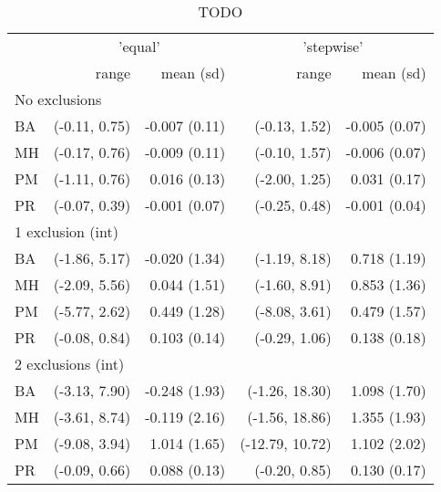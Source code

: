 \begin{table}[t]
\caption{TODO} 
\fontsize{12.0pt}{14.4pt}\selectfont
\begin{tabular}{lrrrr}
\toprule
 & \multicolumn{2}{c}{'equal'} & \multicolumn{2}{c}{'stepwise'} \\ 
\cmidrule(lr){2-3} \cmidrule(lr){4-5}
 & range & mean (sd) & range & mean (sd) \\ 
\midrule
\multicolumn{5}{l}{No exclusions} \\ 
\midrule
\hspace{11.25pt} BA & (-0.11, 0.75) & -0.007 (0.11) & (-0.13, 1.52) & -0.005 (0.07) \\ 
\hspace{11.25pt} MH & (-0.17, 0.76) & -0.009 (0.11) & (-0.10, 1.57) & -0.006 (0.07) \\ 
\hspace{11.25pt} PM & (-1.11, 0.76) & 0.016 (0.13) & (-2.00, 1.25) & 0.031 (0.17) \\ 
\hspace{11.25pt} PR & (-0.07, 0.39) & -0.001 (0.07) & (-0.25, 0.48) & -0.001 (0.04) \\ 
\midrule
\multicolumn{5}{l}{1 exclusion (int)} \\ 
\midrule
\hspace{11.25pt} BA & (-1.86, 5.17) & -0.020 (1.34) & (-1.19, 8.18) & 0.718 (1.19) \\ 
\hspace{11.25pt} MH & (-2.09, 5.56) & 0.044 (1.51) & (-1.60, 8.91) & 0.853 (1.36) \\ 
\hspace{11.25pt} PM & (-5.77, 2.62) & 0.449 (1.28) & (-8.08, 3.61) & 0.479 (1.57) \\ 
\hspace{11.25pt} PR & (-0.08, 0.84) & 0.103 (0.14) & (-0.29, 1.06) & 0.138 (0.18) \\ 
\midrule
\multicolumn{5}{l}{2 exclusions (int)} \\ 
\midrule
\hspace{11.25pt} BA & (-3.13, 7.90) & -0.248 (1.93) & (-1.26, 18.30) & 1.098 (1.70) \\ 
\hspace{11.25pt} MH & (-3.61, 8.74) & -0.119 (2.16) & (-1.56, 18.86) & 1.355 (1.93) \\ 
\hspace{11.25pt} PM & (-9.08, 3.94) & 1.014 (1.65) & (-12.79, 10.72) & 1.102 (2.02) \\ 
\hspace{11.25pt} PR & (-0.09, 0.66) & 0.088 (0.13) & (-0.20, 0.85) & 0.130 (0.17) \\ 

\end{tabular}
\end{table}
